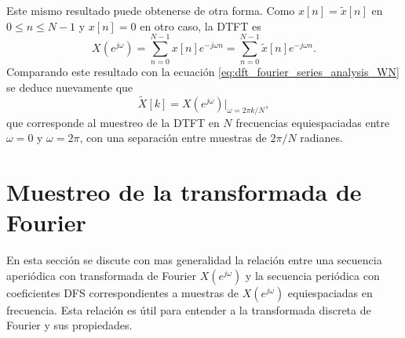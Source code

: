\documentclass[a4paper]{report}
\begin{document}
Este mismo resultado puede obtenerse de otra forma. Como \(x[n]=\tilde{x}[n]\) en \(0\leq n\leq N-1\) y \(x[n]=0\) en otro caso, la DTFT es
\[
 X(e^{j\omega})=\sum_{n=0}^{N-1}x[n]e^{-j\omega n}=\sum_{n=0}^{N-1}\tilde{x}[n]e^{-j\omega n}.
\]
Comparando este resultado con la ecuación \ref{eq:dft_fourier_series_analysis_WN} se deduce nuevamente que 
\[
 \tilde{X}[k]=X(e^{j\omega})\Big|_{\omega=2\pi k/N},
\]
que corresponde al muestreo de la DTFT en \(N\) frecuencias equiespaciadas entre \(\omega=0\) y \(\omega=2\pi\), con una separación entre muestras de \(2\pi/N\) radianes.

\section{Muestreo de la transformada de Fourier}\label{sec:dft_dtft_sampling}

En esta sección se discute con mas generalidad la relación entre una secuencia aperiódica con transformada de Fourier \(X(e^{j\omega})\) y la secuencia periódica con coeficientes DFS correspondientes a muestras de \(X(e^{j\omega})\) equiespaciadas en frecuencia. Esta relación es útil para entender a la transformada discreta de Fourier y sus propiedades.
\end{document}
